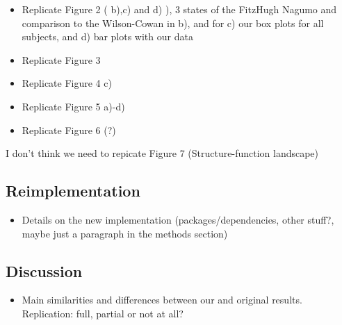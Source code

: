 \begin{itemize}
 \item 
  Replicate Figure 2 ( b),c) and d) ), 3 states of the FitzHugh Nagumo and comparison to the Wilson-Cowan in b),
  and for c) our box plots for all subjects, and d) bar plots with our data
  
 \item
  Replicate Figure 3 

 \item
  Replicate Figure 4 c) 
  
 \item
  Replicate Figure 5 a)-d)
  
 \item
  Replicate Figure 6 (?)
\end{itemize}

I don't think we need to repicate Figure 7 (Structure-function landscape)

\subsection{Reimplementation}

\begin{itemize}
 \item 
  Details on the new implementation (packages/dependencies, other stuff?, maybe just a paragraph in the methods section) 
\end{itemize}

 




\subsection{Discussion}

\begin{itemize}
 \item 
  Main similarities and differences between our and original results. Replication: full, partial or not at all?
\end{itemize}
